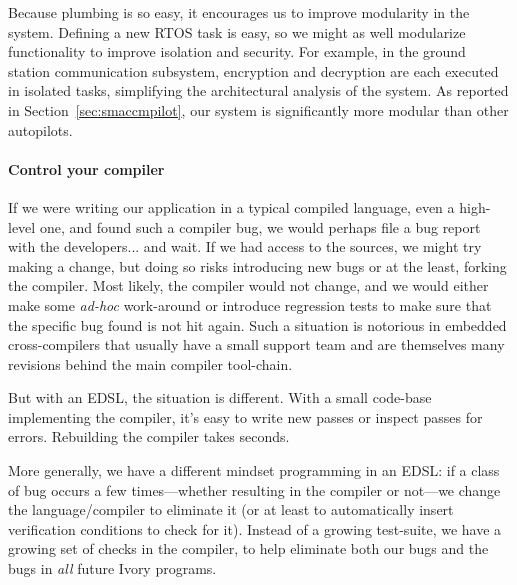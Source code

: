 Because plumbing is so easy, it encourages us to improve modularity in the
system.  Defining a new RTOS task is easy, so we might as well modularize
functionality to improve isolation and security.  For example, in the ground
station communication subsystem, encryption and decryption are each executed in
isolated tasks, simplifying the architectural analysis of the system.  As
reported in Section~\ref{sec:smaccmpilot}, our system is significantly more
modular than other autopilots.

\paragraph{Control your compiler}
If we were writing our application in a typical compiled language, even a
high-level one, and found such a compiler bug, we would perhaps file a bug
report with the developers... and wait.  If we had access to the sources, we
might try making a change, but doing so risks introducing new bugs or at the
least, forking the compiler.  Most likely, the compiler would not change, and we
would either make some \emph{ad-hoc} work-around or introduce regression tests
to make sure that the specific bug found is not hit again.  Such a situation is
notorious in embedded cross-compilers that usually have a small support team and
are themselves many revisions behind the main compiler tool-chain.

But with an EDSL, the situation is different.  With a small code-base
implementing the compiler, it’s easy to write new passes or inspect passes for
errors.  Rebuilding the compiler takes seconds.

More generally, we have a different mindset programming in an EDSL: if a class
of bug occurs a few times---whether resulting in the compiler or not---we change
the language/compiler to eliminate it (or at least to automatically insert
verification conditions to check for it).  Instead of a growing test-suite, we
have a growing set of checks in the compiler, to help eliminate both our bugs
and the bugs in \emph{all} future Ivory programs.

